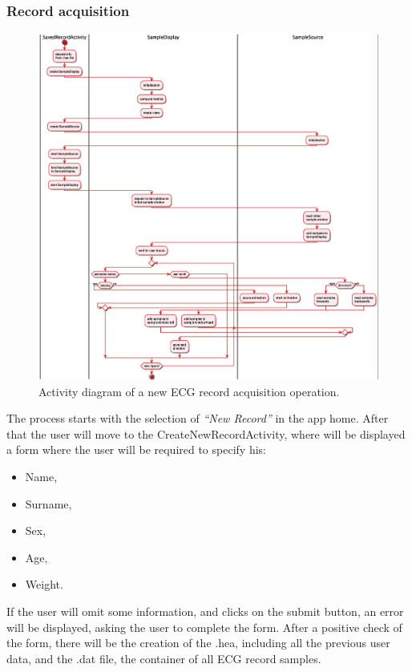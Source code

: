 \subsubsection{Record acquisition}
\begin{figure}[ht!]
	\centering
	\includegraphics[width=\linewidth]{figures/ch9/12.eps}
	\caption{Activity diagram of a new ECG record acquisition operation.}
	\label{fig9.12}
\end{figure}
The process starts with the selection of \textit{“New Record”} in the app home. After that the user will move to the CreateNewRecordActivity, where will be displayed a form where the user will be required to specify his:
\begin{itemize}
	\item Name,
	\item Surname,
	\item Sex,
	\item Age,
	\item Weight.
\end{itemize}
If the user will omit some information, and clicks on the submit button, an error will be displayed, asking the user to complete the form. After a positive check of the form, there will be the creation of the .hea, including all the previous user data, and the .dat file, the container of all ECG record samples.\\
